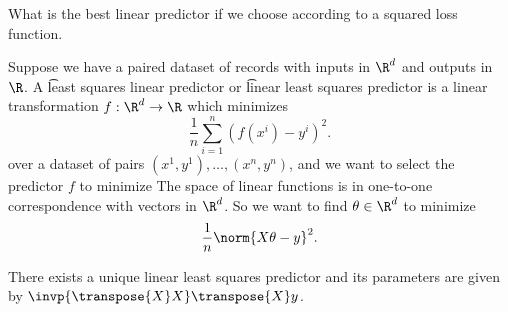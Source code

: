 

What is the best linear predictor if we choose according to a squared loss function.


Suppose we have a paired dataset of records with inputs in $\R^d$ and outputs in $\R$.
A \t{least squares linear predictor} or \t{linear least squares predictor} is a linear transformation $f: \R^d \to \R$ which minimizes
\[
  \frac{1}{n} \sum_{i = 1}^{n} (f(x^i) - y^i)^2.
\]
over a dataset of pairs $(x^1, y^1), \dots, (x^n, y^n)$, and we want to select the predictor $f$ to minimize
The space of linear functions is in one-to-one correspondence with vectors in $\R^d$.
So we want to find $\theta \in \R^d$ to  minimize
\[
  \frac{1}{n} \norm{X\theta - y}^2.
\]

\begin{proposition}
There exists a unique linear least squares predictor and its parameters are given by $\invp{\transpose{X}X}\transpose{X}y$.
\end{proposition}


\blankpage
